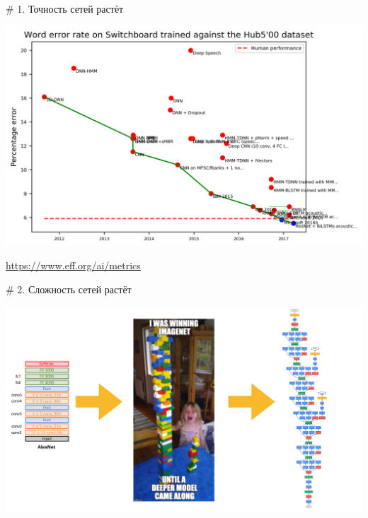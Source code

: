 \documentclass[notes,12pt, aspectratio=169]{beamer}
\begin{document}
\begin{frame}{\# 1. Точность сетей растёт}
\begin{center}
	\includegraphics[width=.7\linewidth]{speech_recognition.png}
\end{center}
\vfill %
\footnotesize
\color{blue} \url{https://www.eff.org/ai/metrics}
\end{frame} 


\begin{frame}{\# 2. Сложность сетей растёт}
\begin{center}
	\includegraphics[width=.9\linewidth]{trend2.png}
\end{center}
\end{frame} 
\end{document}
